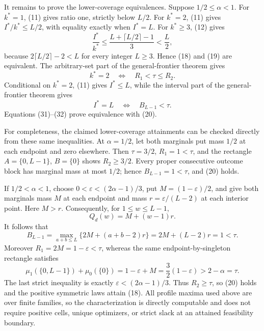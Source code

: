 It remains to prove the lower-coverage equivalences.  Suppose \(1/2\leq\alpha<1\).  For \(k^*=1\), (11) gives ratio one, strictly below \(L/2\).  For \(k^*=2\), (11) gives \(I^*/k^*\leq L/2\), with equality exactly when \(I^*=L\).  For \(k^*\geq3\), (12) gives
\[
 \frac{I^*}{k^*}
 \leq\frac{L+\lceil L/2\rceil-1}{3}
 <\frac L2, \tag{30}
\]
because \(2\lceil L/2\rceil-2<L\) for every integer \(L\geq3\).  Hence (18) and (19) are equivalent.  The arbitrary-set part of the general-frontier theorem gives
\[
 k^*=2\quad\Longleftrightarrow\quad R_1<\tau\leq R_2. \tag{31}
\]
Conditional on \(k^*=2\), (11) gives \(I^*\leq L\), while the interval part of the general-frontier theorem gives
\[
 I^*=L\quad\Longleftrightarrow\quad B_{L-1}<\tau. \tag{32}
\]
Equations (31)--(32) prove equivalence with (20).

For completeness, the claimed lower-coverage attainments can be checked directly from these same inequalities.  At \(\alpha=1/2\), let both marginals put mass \(1/2\) at each endpoint and zero elsewhere.  Then \(\tau=3/2\), \(R_1=1<\tau\), and the rectangle \(A=\{0,L-1\}\), \(B=\{0\}\) shows \(R_2\geq3/2\).  Every proper consecutive outcome block has marginal mass at most \(1/2\); hence \(B_{L-1}=1<\tau\), and (20) holds.

If \(1/2<\alpha<1\), choose \(0<\varepsilon<(2\alpha-1)/3\), put \(M=(1-\varepsilon)/2\), and give both marginals mass \(M\) at each endpoint and mass \(r=\varepsilon/(L-2)\) at each interior point.  Here \(M>r\).  Consequently, for \(1\leq w\leq L-1\),
\[
 Q_d(w)=M+(w-1)r.
\]
It follows that
\[
 B_{L-1}
 =\max_{a+b\leq L}\{2M+(a+b-2)r\}
 =2M+(L-2)r=1<\tau. \tag{33}
\]
Moreover \(R_1=2M=1-\varepsilon<\tau\), whereas the same endpoint-by-singleton rectangle satisfies
\[
 \mu_1(\{0,L-1\})+\mu_0(\{0\})
 =1-\varepsilon+M
 =\frac32(1-\varepsilon)>2-\alpha=\tau. \tag{34}
\]
The last strict inequality is exactly \(\varepsilon<(2\alpha-1)/3\).  Thus \(R_2\geq\tau\), so (20) holds and the positive symmetric laws attain (18).  All profile maxima used above are over finite families, so the characterization is directly computable and does not require positive cells, unique optimizers, or strict slack at an attained feasibility boundary.
